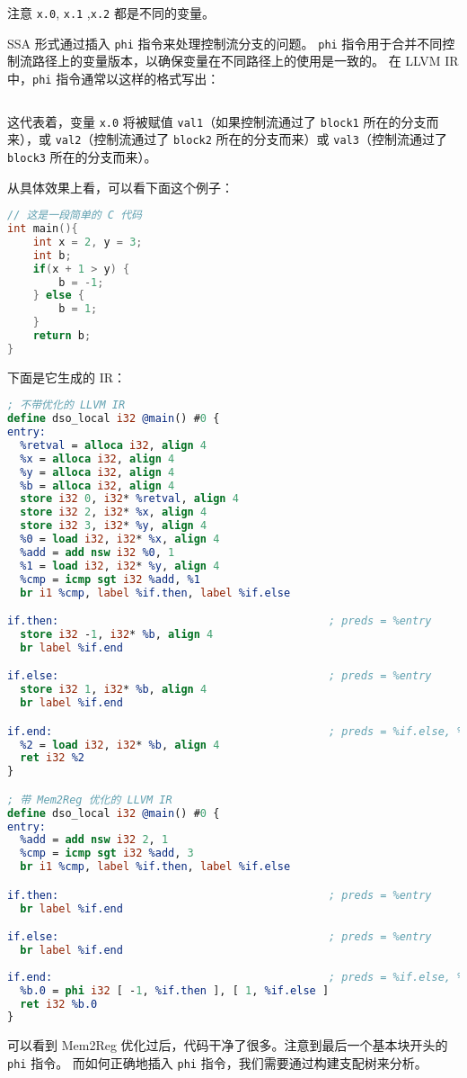 注意 \texttt{x.0}, \texttt{x.1} ,\texttt{x.2} 都是不同的变量。

SSA 形式通过插入 \texttt{phi} 指令来处理控制流分支的问题。
\texttt{phi} 指令用于合并不同控制流路径上的变量版本，以确保变量在不同路径上的使用是一致的。
在 LLVM IR 中，\texttt{phi} 指令通常以这样的格式写出：
\begin{lstlisting}[language=LLVM]
    %x.0 = phi <type> [ <val1>, <block1> ], [ <val2>, <block2> ], [ <val3>, <block3> ]
\end{lstlisting}

这代表着，变量 \texttt{x.0} 将被赋值 \texttt{val1}（如果控制流通过了 \texttt{block1}
所在的分支而来），或 \texttt{val2}（控制流通过了 \texttt{block2}
所在的分支而来）或 \texttt{val3}（控制流通过了 \texttt{block3} 所在的分支而来）。

从具体效果上看，可以看下面这个例子：
\begin{lstlisting}[language=C]
// 这是一段简单的 C 代码
int main(){
    int x = 2, y = 3;
    int b;
    if(x + 1 > y) {
        b = -1;
    } else {
        b = 1;
    }
    return b;
}
\end{lstlisting}

下面是它生成的 IR：

\begin{lstlisting}[language=LLVM]
; 不带优化的 LLVM IR
define dso_local i32 @main() #0 {
entry:
  %retval = alloca i32, align 4
  %x = alloca i32, align 4
  %y = alloca i32, align 4
  %b = alloca i32, align 4
  store i32 0, i32* %retval, align 4
  store i32 2, i32* %x, align 4
  store i32 3, i32* %y, align 4
  %0 = load i32, i32* %x, align 4
  %add = add nsw i32 %0, 1
  %1 = load i32, i32* %y, align 4
  %cmp = icmp sgt i32 %add, %1
  br i1 %cmp, label %if.then, label %if.else

if.then:                                          ; preds = %entry
  store i32 -1, i32* %b, align 4
  br label %if.end

if.else:                                          ; preds = %entry
  store i32 1, i32* %b, align 4
  br label %if.end

if.end:                                           ; preds = %if.else, %if.then
  %2 = load i32, i32* %b, align 4
  ret i32 %2
}

; 带 Mem2Reg 优化的 LLVM IR
define dso_local i32 @main() #0 {
entry:
  %add = add nsw i32 2, 1
  %cmp = icmp sgt i32 %add, 3
  br i1 %cmp, label %if.then, label %if.else

if.then:                                          ; preds = %entry
  br label %if.end

if.else:                                          ; preds = %entry
  br label %if.end
    
if.end:                                           ; preds = %if.else, %if.then
  %b.0 = phi i32 [ -1, %if.then ], [ 1, %if.else ]
  ret i32 %b.0
}
\end{lstlisting}
可以看到 Mem2Reg 优化过后，代码干净了很多。注意到最后一个基本块开头的 \texttt{phi} 指令。
而如何正确地插入 \texttt{phi} 指令，我们需要通过构建支配树来分析。


